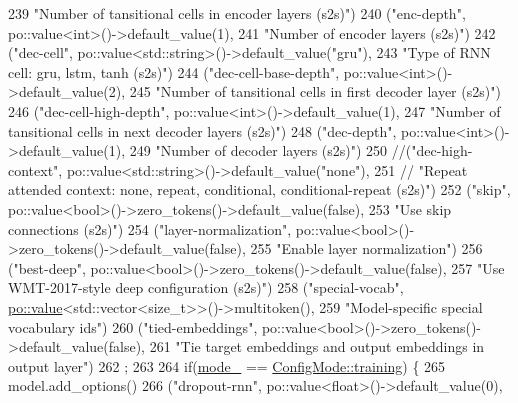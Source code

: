 \begin{DoxyCode}
239      \textcolor{stringliteral}{"Number of tansitional cells in encoder layers (s2s)"})
240     (\textcolor{stringliteral}{"enc-depth"}, po::value<int>()->default\_value(1),
241      \textcolor{stringliteral}{"Number of encoder layers (s2s)"})
242     (\textcolor{stringliteral}{"dec-cell"}, po::value<std::string>()->default\_value(\textcolor{stringliteral}{"gru"}),
243      \textcolor{stringliteral}{"Type of RNN cell: gru, lstm, tanh (s2s)"})
244     (\textcolor{stringliteral}{"dec-cell-base-depth"}, po::value<int>()->default\_value(2),
245      \textcolor{stringliteral}{"Number of tansitional cells in first decoder layer (s2s)"})
246     (\textcolor{stringliteral}{"dec-cell-high-depth"}, po::value<int>()->default\_value(1),
247      \textcolor{stringliteral}{"Number of tansitional cells in next decoder layers (s2s)"})
248     (\textcolor{stringliteral}{"dec-depth"}, po::value<int>()->default\_value(1),
249      \textcolor{stringliteral}{"Number of decoder layers (s2s)"})
250     \textcolor{comment}{//("dec-high-context", po::value<std::string>()->default\_value("none"),}
251     \textcolor{comment}{// "Repeat attended context: none, repeat, conditional, conditional-repeat (s2s)")}
252     (\textcolor{stringliteral}{"skip"}, po::value<bool>()->zero\_tokens()->default\_value(\textcolor{keyword}{false}),
253      \textcolor{stringliteral}{"Use skip connections (s2s)"})
254     (\textcolor{stringliteral}{"layer-normalization"}, po::value<bool>()->zero\_tokens()->default\_value(\textcolor{keyword}{false}),
255      \textcolor{stringliteral}{"Enable layer normalization"})
256     (\textcolor{stringliteral}{"best-deep"}, po::value<bool>()->zero\_tokens()->default\_value(\textcolor{keyword}{false}),
257      \textcolor{stringliteral}{"Use WMT-2017-style deep configuration (s2s)"})
258     (\textcolor{stringliteral}{"special-vocab"}, \hyperlink{namespacemarian_1_1keywords_ac70de1b4c3cf6b7080cf5086f2963fd8}{po::value}<std::vector<size\_t>>()->multitoken(),
259      \textcolor{stringliteral}{"Model-specific special vocabulary ids"})
260     (\textcolor{stringliteral}{"tied-embeddings"}, po::value<bool>()->zero\_tokens()->default\_value(\textcolor{keyword}{false}),
261      \textcolor{stringliteral}{"Tie target embeddings and output embeddings in output layer"})
262     ;
263 
264   \textcolor{keywordflow}{if}(\hyperlink{classmarian_1_1ConfigParser_ae3bb2ffc2601222cc53734a60ab1f980}{mode\_} == \hyperlink{namespacemarian_aaddd4b008ff5352b1fe7e16574f7e1f9ac185ddac8b5a8f5aa23c5b80bc12d214}{ConfigMode::training}) \{
265     model.add\_options()
266       (\textcolor{stringliteral}{"dropout-rnn"}, po::value<float>()->default\_value(0),

\end{DoxyCode}
